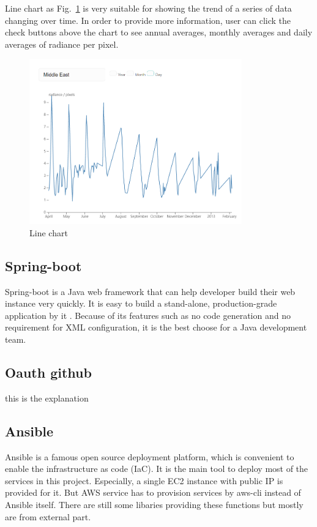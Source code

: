 \documentclass[conference]{IEEEtran}
\begin{document}
Line chart as Fig.~\ref{lchart} is very suitable for showing the trend of a series of data changing over time. In order to provide more 
information, user can click the check buttons above the chart to see annual averages, monthly averages and daily averages of radiance 
per pixel.  

\begin{figure}[htbp]
    \centerline{\includegraphics[width=260pt]{images/Line_chart.png}}
    \caption{Line chart}
    \label{lchart}
\end{figure}

\subsection{Spring-boot}

Spring-boot is a Java web framework that can help developer build their web instance very quickly. It is easy to build a 
stand-alone, production-grade application by it \cite{SpringBo66:online}. Because of its features such as no code generation 
and no requirement for XML configuration, it is the best choose for a Java development team.

\subsection{Oauth github}

this is the explanation

\subsection{Ansible}

Ansible is a famous open source deployment platform, which is convenient to enable the infrastructure as code (IaC). 
It is the main tool to deploy most of the services in this project. Especially, a single EC2 instance with public 
IP is provided for it. But AWS service has to provision services by aws-cli instead of Ansible itself. There are still 
some libaries providing these functions but mostly are from external part.
\end{document}
